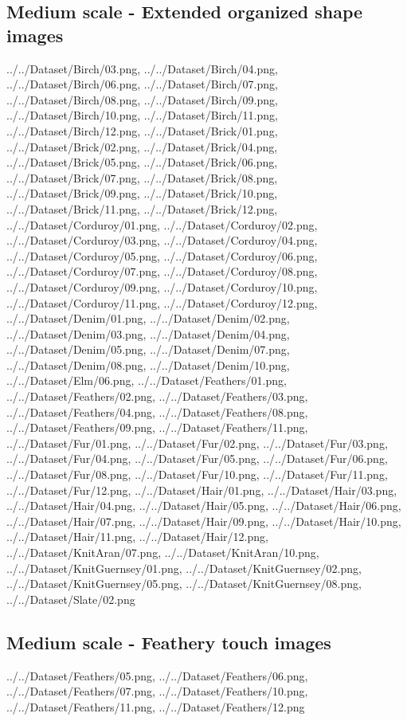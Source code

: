 \subsection{Medium scale - Extended organized shape images}
{../../Dataset/Birch/03.png,
../../Dataset/Birch/04.png,
../../Dataset/Birch/06.png,
../../Dataset/Birch/07.png,
../../Dataset/Birch/08.png,
../../Dataset/Birch/09.png,
../../Dataset/Birch/10.png,
../../Dataset/Birch/11.png,
../../Dataset/Birch/12.png,
../../Dataset/Brick/01.png,
../../Dataset/Brick/02.png,
../../Dataset/Brick/04.png,
../../Dataset/Brick/05.png,
../../Dataset/Brick/06.png,
../../Dataset/Brick/07.png,
../../Dataset/Brick/08.png,
../../Dataset/Brick/09.png,
../../Dataset/Brick/10.png,
../../Dataset/Brick/11.png,
../../Dataset/Brick/12.png,
../../Dataset/Corduroy/01.png,
../../Dataset/Corduroy/02.png,
../../Dataset/Corduroy/03.png,
../../Dataset/Corduroy/04.png,
../../Dataset/Corduroy/05.png,
../../Dataset/Corduroy/06.png,
../../Dataset/Corduroy/07.png,
../../Dataset/Corduroy/08.png,
../../Dataset/Corduroy/09.png,
../../Dataset/Corduroy/10.png,
../../Dataset/Corduroy/11.png,
../../Dataset/Corduroy/12.png,
../../Dataset/Denim/01.png,
../../Dataset/Denim/02.png,
../../Dataset/Denim/03.png,
../../Dataset/Denim/04.png,
../../Dataset/Denim/05.png,
../../Dataset/Denim/07.png,
../../Dataset/Denim/08.png,
../../Dataset/Denim/10.png,
../../Dataset/Elm/06.png,
../../Dataset/Feathers/01.png,
../../Dataset/Feathers/02.png,
../../Dataset/Feathers/03.png,
../../Dataset/Feathers/04.png,
../../Dataset/Feathers/08.png,
../../Dataset/Feathers/09.png,
../../Dataset/Feathers/11.png,
../../Dataset/Fur/01.png,
../../Dataset/Fur/02.png,
../../Dataset/Fur/03.png,
../../Dataset/Fur/04.png,
../../Dataset/Fur/05.png,
../../Dataset/Fur/06.png,
../../Dataset/Fur/08.png,
../../Dataset/Fur/10.png,
../../Dataset/Fur/11.png,
../../Dataset/Fur/12.png,
../../Dataset/Hair/01.png,
../../Dataset/Hair/03.png,
../../Dataset/Hair/04.png,
../../Dataset/Hair/05.png,
../../Dataset/Hair/06.png,
../../Dataset/Hair/07.png,
../../Dataset/Hair/09.png,
../../Dataset/Hair/10.png,
../../Dataset/Hair/11.png,
../../Dataset/Hair/12.png,
../../Dataset/KnitAran/07.png,
../../Dataset/KnitAran/10.png,
../../Dataset/KnitGuernsey/01.png,
../../Dataset/KnitGuernsey/02.png,
../../Dataset/KnitGuernsey/05.png,
../../Dataset/KnitGuernsey/08.png,
../../Dataset/Slate/02.png}

\newpage
\subsection{Medium scale - Feathery touch images}
{../../Dataset/Feathers/05.png,
../../Dataset/Feathers/06.png,
../../Dataset/Feathers/07.png,
../../Dataset/Feathers/10.png,
../../Dataset/Feathers/11.png,
../../Dataset/Feathers/12.png}

